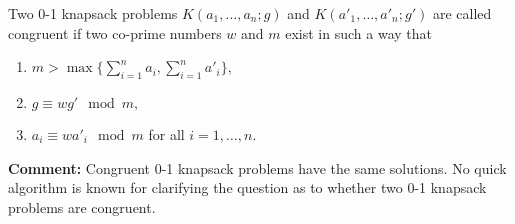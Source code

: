 Two 0-1 knapsack problems  $ K(a_1, \dots, a_n;g) $   and  $ K(a'_1, \dots, 
a'_n;g') $  are called congruent if two  co-prime numbers $ w $ 
and $ m $ exist in such a way that
\begin{enumerate}
    \item $ m > \max \{ \sum_{i=1}^n a_i , \sum_{i=1}^n a'_i \}, $

    \item $ g \equiv wg' \mod m, $

    \item $ a_i \equiv w a'_i \mod m $ for all $ i=1, \dots, n.$

\end{enumerate}
 
{\bf Comment:}
Congruent 0-1 knapsack problems have the same solutions.
No quick algorithm is known for clarifying the question as to whether two 0-1
knapsack problems are congruent.

